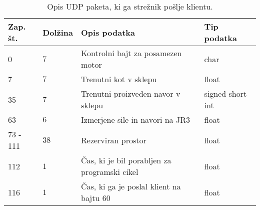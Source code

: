 
\begin{table}[h]
	\centering
	\begin{footnotesize}
		\begin{tabular}{|l l l l |}
		\hline
		Zap. \v{s}t. &  Dol\v{z}ina& Opis podatka & Tip podatka\\ \hline
		0 & $7$ & Kontrolni bajt za posamezen motor & char \\
		7 & $7$ & Trenutni kot v sklepu & float \\
		35 & $7$ & Trenutni proizveden navor v sklepu & signed short int \\
		63 & $6$ & Izmerjene sile in navori na JR3 & float\\
		73 - 111 & $38$ & Rezerviran prostor & float\\
		112 & $1$ & \v{C}as, ki je bil porabljen za programski cikel & float\\
		116 & $1$ & \v{C}as, ki ga je poslal klient na bajtu 60 & float\\ \hline
		\end{tabular}
	\end{footnotesize}
	\caption{Opis UDP paketa, ki ga stre\v{z}nik po\v{s}lje klientu.}
	\label{table:udp-reply}
\end{table}